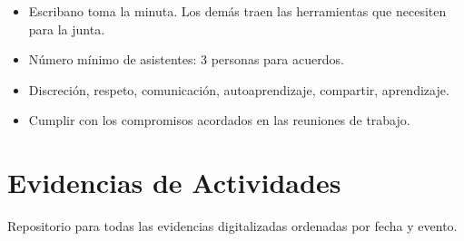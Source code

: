 \documentclass[]{book}
\providecommand{\tightlist}{%
  \setlength{\itemsep}{0pt}\setlength{\parskip}{0pt}}
\begin{document}
\begin{itemize}
\tightlist
\item
  Escribano toma la minuta. Los demás traen las herramientas que
  necesiten para la junta.
\item
  Número mínimo de asistentes: 3 personas para acuerdos.
\item
  Discreción, respeto, comunicación, autoaprendizaje, compartir,
  aprendizaje.
\item
  Cumplir con los compromisos acordados en las reuniones de trabajo.
\end{itemize}

\chapter{Evidencias de Actividades}\label{evidencias-de-actividades}

Repositorio para todas las evidencias digitalizadas ordenadas por fecha
y evento.


\end{document}
